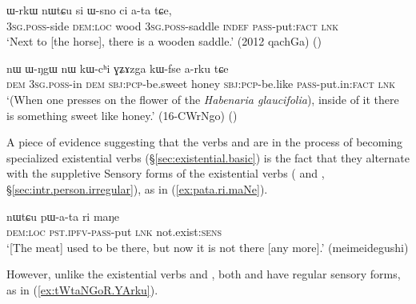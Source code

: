 \begin{exe}
\ex \label{ex:Wsno.ata}
 \gll ɯ-rkɯ nɯtɕu si ɯ-sno ci a-ta tɕe, \\
\textsc{3sg}.\textsc{poss}-side \textsc{dem}:\textsc{loc} wood \textsc{3sg}.\textsc{poss}-saddle \textsc{indef} \textsc{pass}-put:\textsc{fact} \textsc{lnk} \\
\glt `Next to [the horse], there is a wooden saddle.' (2012 qachGa) ()
\end{exe}

\begin{exe}
\ex \label{ex:WNgW.arku}
 \gll %
 nɯ ɯ-ŋgɯ nɯ kɯ-cʰi ɣʑɤzga kɯ-fse a-rku tɕe \\
 \textsc{dem} \textsc{3sg}.\textsc{poss}-in \textsc{dem} \textsc{sbj}:\textsc{pcp}-be.sweet honey \textsc{sbj}:\textsc{pcp}-be.like \textsc{pass}-put.in:\textsc{fact} \textsc{lnk} \\
 \glt `(When one presses on the flower of the \textit{Habenaria glaucifolia}), inside of it there is something sweet like honey.' (16-CWrNgo) ()
  \end{exe}

A piece of evidence suggesting that the verbs   and  are in the process of becoming specialized existential verbs (§\ref{sec:existential.basic}) is the fact that they alternate with the suppletive Sensory forms of the existential verbs ( and , §\ref{sec:intr.person.irregular}), as in (\ref{ex:pata.ri.maNe}). 

\begin{exe}
\ex \label{ex:pata.ri.maNe}
 \gll nɯtɕu pɯ-a-ta ri maŋe \\
 \textsc{dem}:\textsc{loc} \textsc{pst}.\textsc{ipfv}-\textsc{pass}-put \textsc{lnk} not.exist:\textsc{sens} \\
\glt `[The meat] used to be there, but now it is not there [any more].' (meimeidegushi)
  \end{exe}

However, unlike the existential verbs  and , both    and  have regular sensory forms, as in (\ref{ex:tWtaNGoR.YArku}).

